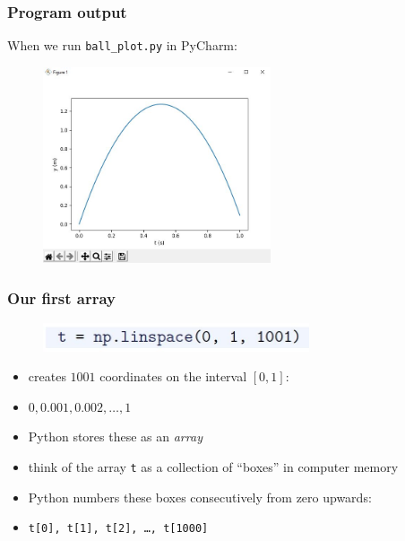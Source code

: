 \documentclass[14pt]{beamer}
\newcommand\red[1]{{\color{red} #1}}
\begin{document}

\begin{frame}[fragile]
\frametitle{Program output}
When we run \texttt{ball\_plot.py} in PyCharm:
\begin{figure}[ht]
	\centering
	\includegraphics[width=0.6\textwidth]{figures/LLp20output}
\end{figure}

\end{frame}


\begin{frame}[fragile]
\frametitle{Our first array}

\begin{figure}[ht]
	\centering
	\includegraphics[width=0.7\textwidth]{figures/LLp20b}
\end{figure}
\vspace*{-8mm}
\begin{itemize}
	\item creates $1001$ coordinates on the interval $[0,1]$:
	\item[] $0, 0.001, 0.002, \ldots, 1$
	\item Python stores these as an \red{\emph{array}}
	\item think of the array \texttt{t} as a collection of ``boxes'' in computer memory
	\item Python numbers these boxes consecutively from zero upwards:
	\item[] \texttt{t[0], t[1], t[2], \ldots, t[1000]}
\end{itemize}

\end{frame}
\end{document}

